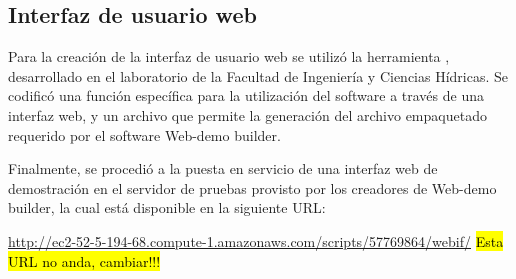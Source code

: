 %
%
\subsection{Interfaz de usuario web}
%
Para la creación de la interfaz de usuario web se utilizó la
herramienta  \cite{webdemobuilder}, desarrollado
en el laboratorio  de la Facultad de Ingeniería y
Ciencias Hídricas.
Se codificó una función específica  para la utilización
del software a través de una interfaz web, y un archivo
 que permite la generación del archivo empaquetado
requerido por el software Web-demo builder.

Finalmente, se procedió a la puesta en servicio de una interfaz web de
demostración en el servidor de pruebas provisto por los creadores de
Web-demo builder, la cual está disponible en la siguiente URL:

\url{http://ec2-52-5-194-68.compute-1.amazonaws.com/scripts/57769864/webif/}
\hl{Esta URL no anda, cambiar!!!}

